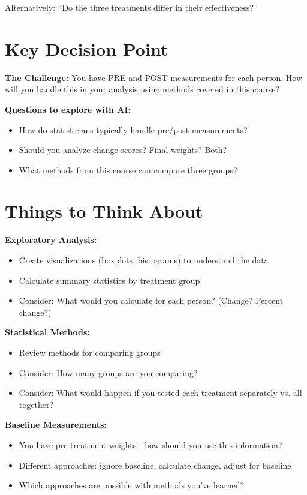 \documentclass[11pt]{article}
\begin{document}
Alternatively: ``Do the three treatments differ in their effectiveness?''

\section*{Key Decision Point}

\begin{tcolorbox}[colback=osaorange!10,colframe=osaorange,boxrule=1pt,arc=2pt]
\textbf{The Challenge:} You have PRE and POST measurements for each person. How will you handle this in your analysis using methods covered in this course?

\textbf{Questions to explore with AI:}
\begin{itemize}
\item How do statisticians typically handle pre/post measurements?
\item Should you analyze change scores? Final weights? Both?
\item What methods from this course can compare three groups?
\end{itemize}
\end{tcolorbox}

\section*{Things to Think About}

\textbf{Exploratory Analysis:}
\begin{itemize}
\item Create visualizations (boxplots, histograms) to understand the data
\item Calculate summary statistics by treatment group
\item Consider: What would you calculate for each person? (Change? Percent change?)
\end{itemize}

\textbf{Statistical Methods:}
\begin{itemize}
\item Review methods for comparing groups
\item Consider: How many groups are you comparing?
\item Consider: What would happen if you tested each treatment separately vs. all together?
\end{itemize}

\textbf{Baseline Measurements:}
\begin{itemize}
\item You have pre-treatment weights - how should you use this information?
\item Different approaches: ignore baseline, calculate change, adjust for baseline
\item Which approaches are possible with methods you've learned?
\end{itemize}
\end{document}

